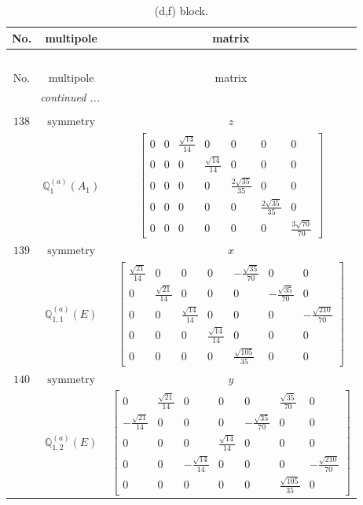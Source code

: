 \documentclass[fleqn,8pt,landscape]{jsarticle}
\begin{document}
\begin{longtable}{ccc}
\caption{(d,f) block.}
 \\
 \hline \hline
No. & multipole & matrix \\ \hline \endfirsthead

\multicolumn{2}{l}{\tablename\ \thetable{}} \\
 \hline \hline
No. & multipole & matrix \\ \hline \endhead

 \hline \hline
\multicolumn{2}{r}{\footnotesize\it continued ...} \\ \endfoot

 \hline \hline
\multicolumn{2}{r}{} \\ \endlastfoot

$ 138 $ & $ \text{symmetry} $ & $ z $ \\
$  $ & $ \mathbb{Q}_{1}^{(a)}(A_{1}) $ & $ \begin{bmatrix} 0 & 0 & \frac{\sqrt{14}}{14} & 0 & 0 & 0 & 0 \\ 0 & 0 & 0 & \frac{\sqrt{14}}{14} & 0 & 0 & 0 \\ 0 & 0 & 0 & 0 & \frac{2 \sqrt{35}}{35} & 0 & 0 \\ 0 & 0 & 0 & 0 & 0 & \frac{2 \sqrt{35}}{35} & 0 \\ 0 & 0 & 0 & 0 & 0 & 0 & \frac{3 \sqrt{70}}{70} \end{bmatrix} $ \\ \hline
$ 139 $ & $ \text{symmetry} $ & $ x $ \\
$  $ & $ \mathbb{Q}_{1,1}^{(a)}(E) $ & $ \begin{bmatrix} \frac{\sqrt{21}}{14} & 0 & 0 & 0 & - \frac{\sqrt{35}}{70} & 0 & 0 \\ 0 & \frac{\sqrt{21}}{14} & 0 & 0 & 0 & - \frac{\sqrt{35}}{70} & 0 \\ 0 & 0 & \frac{\sqrt{14}}{14} & 0 & 0 & 0 & - \frac{\sqrt{210}}{70} \\ 0 & 0 & 0 & \frac{\sqrt{14}}{14} & 0 & 0 & 0 \\ 0 & 0 & 0 & 0 & \frac{\sqrt{105}}{35} & 0 & 0 \end{bmatrix} $ \\ \hline
$ 140 $ & $ \text{symmetry} $ & $ y $ \\
$  $ & $ \mathbb{Q}_{1,2}^{(a)}(E) $ & $ \begin{bmatrix} 0 & \frac{\sqrt{21}}{14} & 0 & 0 & 0 & \frac{\sqrt{35}}{70} & 0 \\ - \frac{\sqrt{21}}{14} & 0 & 0 & 0 & - \frac{\sqrt{35}}{70} & 0 & 0 \\ 0 & 0 & 0 & \frac{\sqrt{14}}{14} & 0 & 0 & 0 \\ 0 & 0 & - \frac{\sqrt{14}}{14} & 0 & 0 & 0 & - \frac{\sqrt{210}}{70} \\ 0 & 0 & 0 & 0 & 0 & \frac{\sqrt{105}}{35} & 0 \end{bmatrix} $ \\ \hline

\end{longtable}
\end{document}
